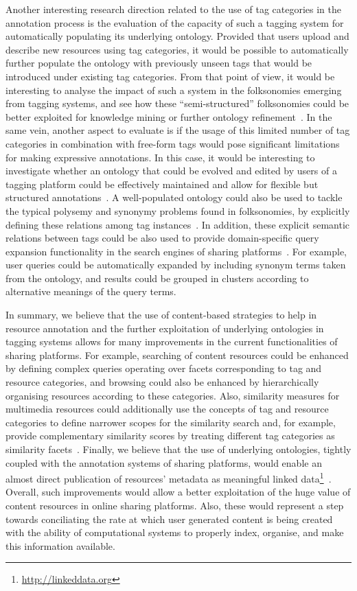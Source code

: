 Another interesting research direction related to the use of tag categories in the annotation process is the evaluation of the capacity of such a tagging system for automatically populating its underlying ontology. Provided that users upload and describe new resources using tag categories, it would be possible to automatically further populate the ontology with previously unseen tags that would be introduced under existing tag categories.
From that point of view, it would be interesting to analyse the impact of such a system in the folksonomies emerging from tagging systems, and see how these ``semi-structured'' folksonomies could be better exploited for knowledge mining or further ontology refinement~\citep{limpens2009linking}.
In the same vein, another aspect to evaluate is if the usage of this limited number of tag categories in combination with free-form tags would pose significant limitations for making expressive annotations. In this case, it would be interesting to investigate whether an ontology that could be evolved and edited by users of a tagging platform could be effectively maintained and allow for flexible but structured annotations~\citep[e.g.,][]{Stojanovic2002,Braun2007}.
A well-populated ontology could also be used to tackle the typical polysemy and synonymy problems found in folksonomies, by explicitly defining these relations among tag instances~\citep[e.g.,][]{Echarte2007,Lohmann2011}. 
In addition, these explicit semantic relations between tags could be also used to provide domain-specific query expansion functionality in the search engines of sharing platforms~\citep{Bhogal2007}. For example, user queries could be automatically expanded by including synonym terms taken from the ontology, and results could be grouped in clusters according to alternative meanings of the query terms.

In summary, we believe that the use of content-based strategies to help in resource annotation and the further exploitation of underlying ontologies in tagging systems allows for many improvements in the current functionalities of sharing platforms.
For example, searching of content resources could be enhanced by defining complex queries operating over facets corresponding to tag and resource categories, and browsing could also be enhanced by hierarchically organising resources according to these categories.
Also, similarity measures for multimedia resources could additionally use the concepts of tag and resource categories to define narrower scopes for the similarity search and, for example, provide complementary similarity scores by treating different tag categories as similarity facets~\citep{Bogdanov2011a}.
Finally, we believe that the use of underlying ontologies, tightly coupled with the annotation systems of sharing platforms, would enable an almost direct publication of resources' metadata as meaningful linked data\footnote{\url{http://linkeddata.org}}~\citep{Bizer2009b}.
Overall, such improvements would allow a better exploitation of the huge value of content resources in online sharing platforms. Also, these would represent a step towards conciliating the rate at which user generated content is being created with the ability of computational systems to properly index, organise, and make this information available.

